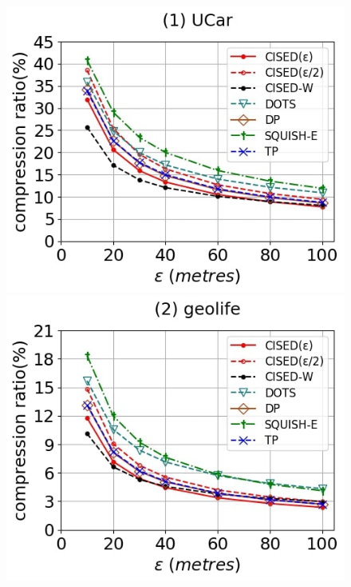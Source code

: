 \begin{figure}[tb!]
	\centering
	\includegraphics[scale=0.250]{Figures/Exp-SED-CR-epsilon-service.jpg} 	\hspace{0.5ex}
	\includegraphics[scale=0.250]{Figures/Exp-SED-CR-epsilon-geolife.jpg}	\hspace{0.5ex}

\end{figure}
